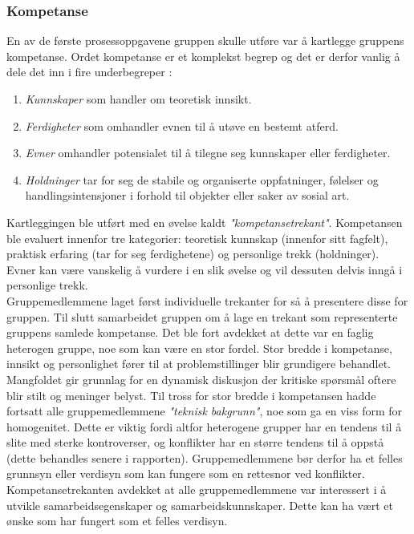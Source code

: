 \subsubsection{Kompetanse}
En av de første prosessoppgavene gruppen skulle utføre var å kartlegge gruppens kompetanse.
Ordet kompetanse er et komplekst begrep og det er derfor vanlig å dele det inn i fire underbegreper \cite{orgorg}:
\begin{enumerate}
\item \textit{Kunnskaper} som handler om teoretisk innsikt.
\item \textit{Ferdigheter} som omhandler evnen til å utøve en bestemt atferd.
\item \textit{Evner} omhandler potensialet til å tilegne seg kunnskaper eller ferdigheter.
\item \textit{Holdninger} tar for seg de stabile og organiserte oppfatninger, følelser og handlingsintensjoner i forhold til objekter eller saker av sosial art.
\end{enumerate}
Kartleggingen ble utført med en øvelse kaldt \emph{"kompetansetrekant"}.
Kompetansen ble evaluert innenfor tre kategorier: teoretisk kunnskap (innenfor sitt fagfelt), praktisk erfaring (tar for seg ferdighetene) og personlige trekk (holdninger).
Evner kan være vanskelig å vurdere i en slik øvelse og vil dessuten delvis inngå i personlige trekk.
\\
Gruppemedlemmene laget først individuelle trekanter for så å presentere disse for gruppen.
Til slutt samarbeidet gruppen om å lage en trekant som representerte gruppens samlede kompetanse.
Det ble fort avdekket at dette var en faglig heterogen gruppe, noe som kan være en stor fordel.
Stor bredde i kompetanse, innsikt og personlighet fører til at problemstillinger blir grundigere behandlet.
Mangfoldet gir grunnlag for en dynamisk diskusjon der kritiske spørsmål oftere blir stilt og meninger belyst.
Til tross for stor bredde i kompetansen hadde fortsatt alle gruppemedlemmene \emph{"teknisk bakgrunn"}, noe som ga en viss form for homogenitet.
Dette er viktig fordi altfor heterogene grupper har en tendens til å slite med sterke kontroverser, og konflikter har en større tendens til å oppstå (dette behandles senere i rapporten).
Gruppemedlemmene bør derfor ha et felles grunnsyn eller verdisyn som kan fungere som en rettesnor ved konflikter.
Kompetansetrekanten avdekket at alle gruppemedlemmene var interessert i å utvikle samarbeidsegenskaper og samarbeidskunnskaper.
Dette kan ha vært et ønske som har fungert som et felles verdisyn. 
\\
